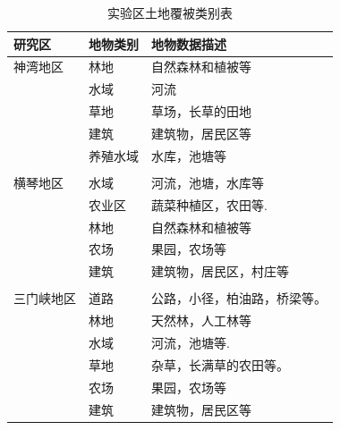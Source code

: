 \begin{table}[htbp]
    \caption{ 实验区土地覆被类别表}\label{tab:1}
    \centering
    \begin{tabular}{p{2.5cm}p{2cm}p{6cm}}
        \toprule
        研究区     & 地物类别 & 地物数据描述                 \\
        \midrule
        神湾地区   & 林地     & 自然森林和植被等             \\
                   & 水域     & 河流                         \\
                   & 草地     & 草场，长草的田地             \\
                   & 建筑     & 建筑物，居民区等             \\
                   & 养殖水域 & 水库，池塘等                 \\
                   &          &                              \\
        横琴地区   & 水域     & 河流，池塘，水库等           \\
                   & 农业区   & 蔬菜种植区，农田等.          \\
                   & 林地     & 自然森林和植被等             \\
                   & 农场     & 果园，农场等                 \\
                   & 建筑     & 建筑物，居民区，村庄等       \\
                   &          &                              \\
        三门峡地区 & 道路     & 公路，小径，柏油路，桥梁等。 \\
                   & 林地     & 天然林，人工林等             \\
                   & 水域     & 河流，池塘等.                \\
                   & 草地     & 杂草，长满草的农田等。       \\
                   & 农场     & 果园，农场等                 \\
                   & 建筑     & 建筑物，居民区等             \\
        \bottomrule
    \end{tabular}
\end{table}


